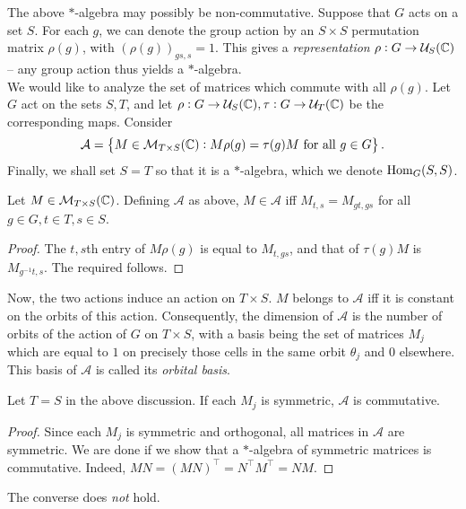 	The above $*$-algebra may possibly be non-commutative. Suppose that $G$ acts on a set $S$. For each $g$, we can denote the group action by an $S \times S$ permutation matrix $\rho(g)$, with $(\rho(g))_{gs,s} = 1$. This gives a \emph{representation} $\rho : G \to \mathcal{U}_{S}(\mathbb{C})$ -- any group action thus yields a $*$-algebra.\\
	We would like to analyze the set of matrices which commute with all $\rho(g)$. Let $G$ act on the sets $S,T$, and let $\rho : G \to \mathcal{U}_S(\mathbb{C}), \tau : G \to \mathcal{U}_T(\mathbb{C})$ be the corresponding maps. Consider
	\[ \mathcal{A} = \left\{ M \in \mathcal{M}_{T \times S}(\mathbb{C}) : M \rho(g) = \tau(g) M \text{ for all $g \in G$} \right\}. \]
	Finally, we shall set $S = T$ so that it is a $*$-algebra, which we denote $\operatorname{Hom}_G(S,S)$.

	\begin{flem}
		Let $M \in \mathcal{M}_{T \times S}(\mathbb{C})$. Defining $\mathcal{A}$ as above, $M \in \mathcal{A}$ iff $M_{t,s} = M_{gt,gs}$ for all $g \in G, t \in T,s \in S$.
	\end{flem}
	\begin{proof}
		The $t,s$th entry of $M\rho(g)$ is equal to $M_{t,gs}$, and that of $\tau(g)M$ is $M_{g^{-1}t,s}$. The required follows.
	\end{proof}

	Now, the two actions induce an action on $T \times S$. $M$ belongs to $\mathcal{A}$ iff it is constant on the orbits of this action. Consequently, the dimension of $\mathcal{A}$ is the number of orbits of the action of $G$ on $T \times S$, with a basis being the set of matrices $M_j$ which are equal to $1$ on precisely those cells in the same orbit $\theta_j$ and $0$ elsewhere.\\
	This basis of $\mathcal{A}$ is called its \emph{orbital basis}.

	\begin{flem}
		\label{lem: gelfands lemma}
		Let $T = S$ in the above discussion. If each $M_j$ is symmetric, $\mathcal{A}$ is commutative.
	\end{flem}
	\begin{proof}
		Since each $M_j$ is symmetric and orthogonal, all matrices in $\mathcal{A}$ are symmetric. We are done if we show that a $*$-algebra of symmetric matrices is commutative. Indeed, $MN = (MN)^\top = N^\top M^\top = NM$.
	\end{proof}

	The converse does \emph{not} hold.

